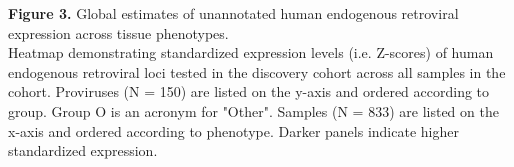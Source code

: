 \textbf{Figure 3.} Global estimates of unannotated human endogenous retroviral expression across tissue phenotypes. \\
Heatmap demonstrating standardized expression levels (i.e. Z-scores) of human endogenous retroviral loci tested in the discovery cohort across all samples in the cohort.
Proviruses (N = 150) are listed on the y-axis and ordered according to group.
Group O is an acronym for "Other".
Samples (N = 833) are listed on the x-axis and ordered according to phenotype.
Darker panels indicate higher standardized expression.
